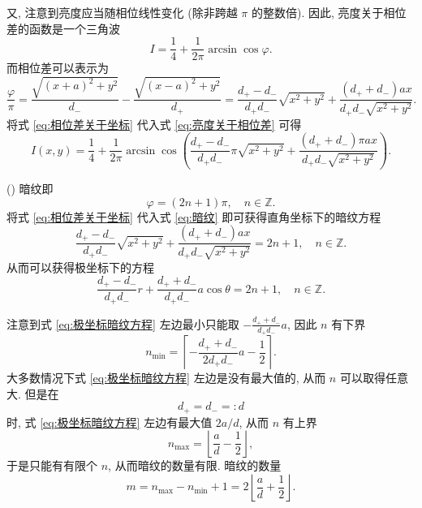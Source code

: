\documentclass{article}
\newcounter{para}
\newcommand\mypara{\par\refstepcounter{para}(\thepara)\space}
\begin{document}
又, 注意到亮度应当随相位线性变化 (除非跨越 $\pi$ 的整数倍).
因此, 亮度关于相位差的函数是一个三角波
\begin{equation}
	\label{eq:亮度关于相位差}
	I=\frac14+\frac1{2\pi}\arcsin\cos\varphi.
\end{equation}
而相位差可以表示为
\begin{equation}
	\label{eq:相位差关于坐标}
	\frac\varphi\pi=\frac{\sqrt{\left(x+a\right)^2+y^2}}{d_-}-
	\frac{\sqrt{\left(x-a\right)^2+y^2}}{d_+}
	=\frac{d_+-d_-}{d_+d_-}\sqrt{x^2+y^2}
	+\frac{\left(d_++d_-\right)ax}{d_+d_-\sqrt{x^2+y^2}}.
\end{equation}
将式 \ref{eq:相位差关于坐标} 代入式 \ref{eq:亮度关于相位差} 可得
\begin{equation}
	I\!\left(x,y\right)=\frac14+\frac1{2\pi}\arcsin\cos\!\left(
	\frac{d_+-d_-}{d_+d_-}\pi\sqrt{x^2+y^2}
	+\frac{\left(d_++d_-\right)\pi ax}{d_+d_-\sqrt{x^2+y^2}}\right).
\end{equation}

\mypara
暗纹即
\begin{equation}
	\label{eq:暗纹}
	\varphi=\left(2n+1\right)\pi,\quad n\in\mathbb Z.
\end{equation}
将式 \ref{eq:相位差关于坐标} 代入式 \ref{eq:暗纹} 即可获得直角坐标下的暗纹方程
\begin{equation}
	\frac{d_+-d_-}{d_+d_-}\sqrt{x^2+y^2}
	+\frac{\left(d_++d_-\right)ax}{d_+d_-\sqrt{x^2+y^2}}=2n+1,
	\quad n\in\mathbb Z.
\end{equation}
从而可以获得极坐标下的方程
\begin{equation}
	\label{eq:极坐标暗纹方程}
	\frac{d_+-d_-}{d_+d_-}r
	+\frac{d_++d_-}{d_+d_-}a\cos\theta=2n+1,
	\quad n\in\mathbb Z.
\end{equation}

注意到式 \ref{eq:极坐标暗纹方程} 左边最小只能取 $-\frac{d_++d_-}{d_+d_-}a$,
因此 $n$ 有下界
\begin{equation}
	n_{\mathrm{min}}=\left\lceil-\frac{d_++d_-}{2d_+d_-}a-\frac12\right\rceil.
\end{equation}
大多数情况下式 \ref{eq:极坐标暗纹方程} 左边是没有最大值的, 从而 $n$ 可以取得任意大.
但是在
\begin{equation}
	d_+=d_-=:d
\end{equation}
时, 式 \ref{eq:极坐标暗纹方程} 左边有最大值 $2a/d$, 从而 $n$ 有上界
\begin{equation}
	n_{\mathrm{max}}=\left\lfloor\frac ad-\frac12\right\rfloor,
\end{equation}
于是只能有有限个 $n$, 从而暗纹的数量有限.
暗纹的数量
\begin{equation}
	m=n_{\mathrm{max}}-n_{\mathrm{min}}+1
	=2\left\lfloor\frac ad+\frac12\right\rfloor.
\end{equation}
\end{document}

